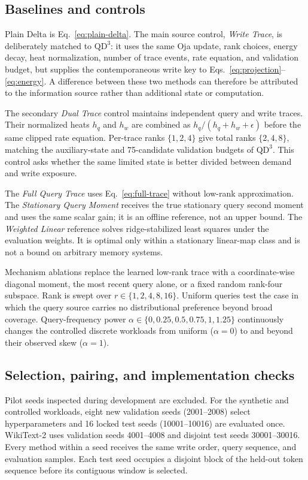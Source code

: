 \documentclass[pdflatex,sn-mathphys-num]{sn-jnl}
\theoremstyle{thmstyleone}
\newcommand{\QDDD}{\ensuremath{\mathrm{QD}^{3}}}
\begin{document}
\subsection{Baselines and controls}

Plain Delta is Eq.~\eqref{eq:plain-delta}. The main source control, \emph{Write Trace}, is deliberately matched to \QDDD: it uses the same Oja update, rank choices, energy decay, heat normalization, number of trace events, rate equation, and validation budget, but supplies the contemporaneous write key to Eqs.~\eqref{eq:projection}--\eqref{eq:energy}. A difference between these two methods can therefore be attributed to the information source rather than additional state or computation.

The secondary \emph{Dual Trace} control maintains independent query and write traces. Their normalized heats $h_q$ and $h_w$ are combined as $h_q/(h_q+h_w+\epsilon)$ before the same clipped rate equation. Per-trace ranks $\{1,2,4\}$ give total ranks $\{2,4,8\}$, matching the auxiliary-state and 75-candidate validation budgets of \QDDD. This control asks whether the same limited state is better divided between demand and write exposure.

The \emph{Full Query Trace} uses Eq.~\eqref{eq:full-trace} without low-rank approximation. The \emph{Stationary Query Moment} receives the true stationary query second moment and uses the same scalar gain; it is an offline reference, not an upper bound. The \emph{Weighted Linear} reference solves ridge-stabilized least squares under the evaluation weights. It is optimal only within a stationary linear-map class and is not a bound on arbitrary memory systems.

Mechanism ablations replace the learned low-rank trace with a coordinate-wise diagonal moment, the most recent query alone, or a fixed random rank-four subspace. Rank is swept over $r\in\{1,2,4,8,16\}$. Uniform queries test the case in which the query source carries no distributional preference beyond broad coverage. Query-frequency power $\alpha\in\{0,0.25,0.5,0.75,1,1.25\}$ continuously changes the controlled discrete workloads from uniform ($\alpha=0$) to and beyond their observed skew ($\alpha=1$).

\subsection{Selection, pairing, and implementation checks}

Pilot seeds inspected during development are excluded. For the synthetic and controlled workloads, eight new validation seeds (2001--2008) select hyperparameters and 16 locked test seeds (10001--10016) are evaluated once. WikiText-2 uses validation seeds 4001--4008 and disjoint test seeds 30001--30016. Every method within a seed receives the same write order, query sequence, and evaluation samples. Each test seed occupies a disjoint block of the held-out token sequence before its contiguous window is selected.
\end{document}
